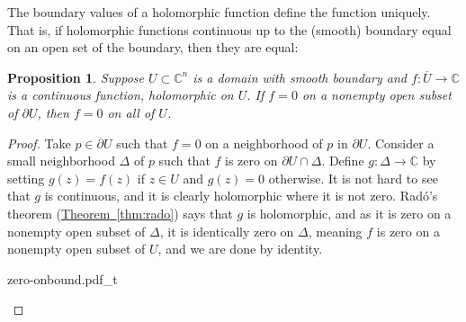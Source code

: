 \documentclass[12pt,openany]{book}
\renewcommand{\Re}{\operatorname{Re}}
\renewcommand{\Im}{\operatorname{Im}}
\newcommand{\C}{{\mathbb{C}}}
\theoremstyle{plain}
\newtheorem{prop}[thm]{Proposition}
\theoremstyle{remark}
\theoremstyle{definition}
\newenvironment{myfig}{%
    \begin{center}
}{%
    \end{center}
}
\theoremstyle{exercise}
\theoremstyle{example}
\newcommand{\thmref}[1]{\hyperref[#1]{Theorem~\ref*{#1}}}
\begin{document}
\pagebreak[2]
The boundary values of a holomorphic function define the function uniquely.
That is, if holomorphic functions continuous up to the (smooth) boundary equal on an
open set of the boundary, then they are equal:

\begin{prop}
Suppose $U \subset \C^n$ is a domain with smooth boundary and $f \colon \overline{U} \to \C$ is 
a continuous function, holomorphic on $U$.  If $f=0$ on a nonempty open subset of $\partial
U$, then $f=0$ on all of $U$.
\end{prop}

\begin{proof}
Take $p \in \partial U$ such that $f=0$ on a neighborhood of $p$ in
$\partial U$.  Consider a small neighborhood $\Delta$ of $p$ such
that $f$ is zero on $\partial U \cap \Delta$.  Define $g \colon \Delta \to
\C$ by setting $g(z) = f(z)$ if $z \in U$ and $g(z) = 0$ otherwise.
It is not hard to see that $g$ is continuous, and it is clearly holomorphic
where it is not zero.  Rad{\'o}'s theorem
(\thmref{thm:rado}) says that $g$ is holomorphic, and as it is zero on a
nonempty open subset of $\Delta$, it is identically zero on $\Delta$,
meaning $f$ is zero on a nonempty open subset of $U$, and we are done by
identity.

\begin{myfig}
{zero-onbound.pdf_t}
\end{myfig}
%
\end{proof}
\end{document}
